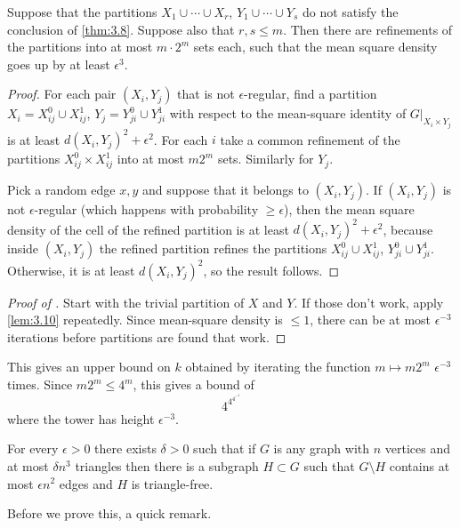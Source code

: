 \documentclass{article}
\newcommand{\1}[1]{\mathbbm{1}_{#1}}
\begin{document}
\begin{nlemma}\label{lem:3.10}
  Suppose that the partitions $X_1 \cup \dotsb \cup X_r$, $Y_1 \cup \dotsb \cup Y_s$ do not satisfy the conclusion of \cref{thm:3.8}.
  Suppose also that $r,s \leq m$. Then there are refinements of the partitions into at most $m \cdot 2^m$ sets each, such that the mean square density goes up by at least $\epsilon^3$.
\end{nlemma}
\begin{proof}
  For each pair $(X_i, Y_j)$ that is not $\epsilon$-regular, find a partition $X_i = X_{ij}^0 \cup X_{ij}^1$, $Y_j = Y_{ji}^0 \cup Y_{ji}^1$ with respect to the mean-square identity of $G|_{X_i \times Y_j}$ is at least $d(X_i, Y_j)^2 + \epsilon^2$.
  For each $i$ take a common refinement of the partitions $X_{ij}^0 \times X_{ij}^1$ into at most $m 2^m$ sets.
  Similarly for $Y_j$.

  Pick a random edge $x,y$ and suppose that it belongs to $(X_i,Y_j)$.
  If $(X_i,Y_j)$ is not $\epsilon$-regular (which happens with probability $\geq \epsilon$), then the mean square density of the cell of the refined partition is at least $d(X_i, Y_j)^2 + \epsilon^2$, because inside $(X_i, Y_j)$ the refined partition refines the partitions $X_{ij}^0 \cup X_{ij}^1$, $Y_{ji}^0 \cup Y_{ji}^1$.
  Otherwise, it is at least $d(X_i,Y_j)^2$, so the result follows.
\end{proof}
\begin{proof}[Proof of ]
  Start with the trivial partition of $X$ and $Y$.
  If those don't work, apply \cref{lem:3.10} repeatedly. Since mean-square density is $\leq 1$, there can be at most $\epsilon^{-3}$ iterations before partitions are found that work.
\end{proof}
This gives an upper bound on $k$ obtained by iterating the function $m \mapsto m 2^m$ $\epsilon^{-3}$ times. Since $m 2^m \leq 4^m$, this gives a bound of
\begin{equation*}
  4^{4^{4^{\iddots^4}}}
\end{equation*}
where the tower has height $\epsilon^{-3}$.
\begin{nthm}\label{thm:3.11}
  For every $\epsilon>0$ there exists $\delta > 0$ such that if $G$ is any graph with $n$ vertices and at most $\delta n^3$ triangles then there is a subgraph $H \subset G$ such that $G \setminus H$ contains at most $\epsilon n^2$ edges and $H$ is triangle-free.
\end{nthm}
Before we prove this, a quick remark.
\end{document}
